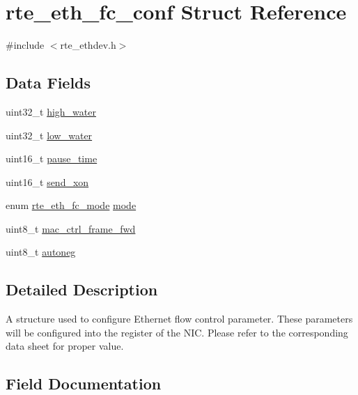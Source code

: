 \hypertarget{structrte__eth__fc__conf}{}\section{rte\+\_\+eth\+\_\+fc\+\_\+conf Struct Reference}
\label{structrte__eth__fc__conf}


{\ttfamily \#include $<$rte\+\_\+ethdev.\+h$>$}

\subsection*{Data Fields}
\begin{DoxyCompactItemize}
\item 
uint32\+\_\+t \hyperlink{structrte__eth__fc__conf_a77e5980d56f7b1356a45426503ecbe9c}{high\+\_\+water}
\item 
uint32\+\_\+t \hyperlink{structrte__eth__fc__conf_a2465d5c755557f2dbfe4aeed3f14a05c}{low\+\_\+water}
\item 
uint16\+\_\+t \hyperlink{structrte__eth__fc__conf_a9c5843ca5d190bd3dd3ae334bc7387e7}{pause\+\_\+time}
\item 
uint16\+\_\+t \hyperlink{structrte__eth__fc__conf_a2a3dce6291881ac9be7fb969ee0b67a7}{send\+\_\+xon}
\item 
enum \hyperlink{rte__ethdev_8h_a9caad71a6958aaf72dfce61bac897ad3}{rte\+\_\+eth\+\_\+fc\+\_\+mode} \hyperlink{structrte__eth__fc__conf_a442a0de0c0746fb498cb5b46772e2707}{mode}
\item 
uint8\+\_\+t \hyperlink{structrte__eth__fc__conf_aaf79da978712211b44adcddc8876d818}{mac\+\_\+ctrl\+\_\+frame\+\_\+fwd}
\item 
uint8\+\_\+t \hyperlink{structrte__eth__fc__conf_a60eea7c64537879a9107354b1c2e75a0}{autoneg}
\end{DoxyCompactItemize}


\subsection{Detailed Description}
A structure used to configure Ethernet flow control parameter. These parameters will be configured into the register of the N\+I\+C. Please refer to the corresponding data sheet for proper value. 

\subsection{Field Documentation}
\hypertarget{structrte__eth__fc__conf_a60eea7c64537879a9107354b1c2e75a0}{}
